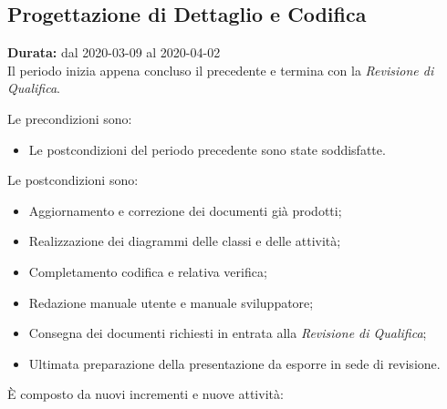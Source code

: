 \subsection{Progettazione di Dettaglio e Codifica}
\label{progettazione_di_dettaglio}
\textbf{Durata:} dal 2020-03-09 al 2020-04-02 \\
Il periodo inizia appena concluso il precedente e termina con la \textit{Revisione di Qualifica}. 

Le precondizioni sono:
\begin{itemize}
    \item Le postcondizioni del periodo precedente sono state soddisfatte.
\end{itemize}

Le postcondizioni sono:
\begin{itemize}
    \item Aggiornamento e correzione dei documenti già prodotti;
    \item Realizzazione dei diagrammi delle classi e delle attività;
    \item Completamento codifica e relativa verifica;
    \item Redazione manuale utente e manuale sviluppatore;
    \item Consegna dei documenti richiesti in entrata alla \textit{Revisione di Qualifica};
    \item Ultimata preparazione della presentazione da esporre in sede di revisione.
\end{itemize}
È composto da nuovi incrementi e nuove attività:

